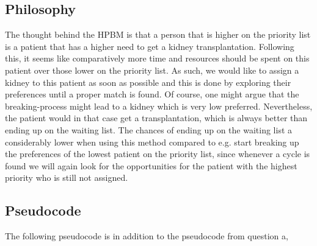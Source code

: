 \documentclass{article}
\begin{document}
\subsection{Philosophy}
The thought behind the HPBM is that a person that is higher on the priority list is a patient that has a higher need to get a kidney transplantation. Following this, it seems like comparatively more time and resources should be spent on this patient over those lower on the priority list. As such, we would like to assign a kidney to this patient as soon as possible and this is done by exploring their preferences until a proper match is found. Of course, one might argue that the breaking-process might lead to a kidney which is very low preferred. Nevertheless, the patient would in that case get a transplantation, which is always better than ending up on the waiting list. The chances of ending up on the waiting list a considerably lower when using this method compared to e.g. start breaking up the preferences of the lowest patient on the priority list, since whenever a cycle is found we will again look for the opportunities for the patient with the highest priority who is still not assigned. 

\subsection{Pseudocode}
The following pseudocode is in addition to the pseudocode from question a,
\end{document}
